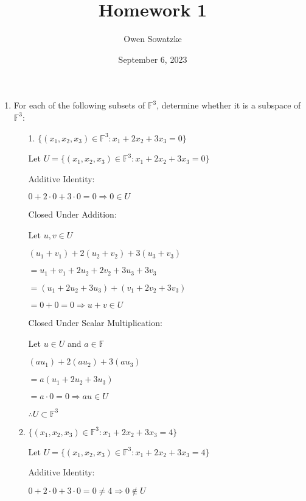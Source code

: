 \documentclass{article}
\title{Homework 1}
\author{Owen Sowatzke}
\date{September 6, 2023}
\begin{document}
	\setlength{\abovedisplayskip}{0pt}
	\setlength{\belowdisplayskip}{0pt}
		\setlength{\abovedisplayshortskip}{0pt}
	\setlength{\belowdisplayshortskip}{0pt}
	\doublespacing
	\maketitle
	
	\begin{enumerate}[nolistsep]
	
		\item For each of the following subsets of $\mathbb{F}^3$, determine whether it is a subspace of $\mathbb{F}^3$:
		
		\begin{enumerate}[nolistsep]
		
			\item[1.] ${\{(x_1, x_2, x_3) \in \mathbb{F}^3 : x_1 + 2x_2 + 3x_3 = 0 \}}$
			
			Let $U = {\{(x_1, x_2, x_3) \in \mathbb{F}^3 : x_1 + 2x_2 + 3x_3 = 0 \}}$
			
			Additive Identity:
			
			$ 0 + 2 \cdot 0 + 3 \cdot 0 = 0 \Rightarrow 0 \in U $
			
			Closed Under Addition:
			
			Let $u,v \in U$
			
			$(u_1 + v_1) + 2(u_2 + v_2) + 3(u_3 + v_3)$
			
			$ = u_1 + v_1 + 2u_2 + 2v_2 + 3u_3 + 3v_3$
			
			$ = (u_1 + 2u_2 + 3u_3) + (v_1 + 2v_2 + 3v_3)$
			
			$ = 0 + 0 = 0 \Rightarrow u + v \in U$
			
			Closed Under Scalar Multiplication:
			
			Let $u \in U$ and $a \in \mathbb{F}$
			
			$(au_1) + 2(au_2) + 3(au_3)$
			
			$ = a(u_1 + 2u_2 + 3u_3)$
			
			$ = a \cdot 0 = 0 \Rightarrow au \in U$
			
			$ \therefore U \subset \mathbb{F}^3$
			
			\item ${\{(x_1, x_2, x_3) \in \mathbb{F}^3 : x_1 + 2x_2 + 3x_3 = 4 \}}$
			
			Let $U = {\{(x_1, x_2, x_3) \in \mathbb{F}^3 : x_1 + 2x_2 + 3x_3 = 4 \}}$
			
			Additive Identity:
			
			$0 + 2 \cdot 0 + 3 \cdot 0 = 0 \neq 4 \Rightarrow 0 \notin U$
			

\end{enumerate}
\end{enumerate}
\end{document}
